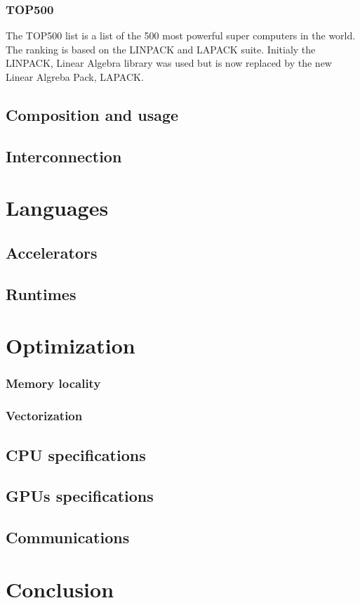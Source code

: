 \subsubsection{TOP500}

The TOP500 list is a list of the 500 most powerful super computers in the world.
The ranking is based on the LINPACK and LAPACK suite. 
Initialy the LINPACK, Linear Algebra library was used but is now replaced by the new Linear Algreba Pack, LAPACK. 

\subsection{Composition and usage}

\subsection{Interconnection}

\section{Languages}

\subsection{Accelerators}

\subsection{Runtimes}

\section{Optimization}


\subsubsection{Memory locality}

\subsubsection{Vectorization}

\subsection{CPU specifications}

\subsection{GPUs specifications}

\subsection{Communications}

\section{Conclusion}
